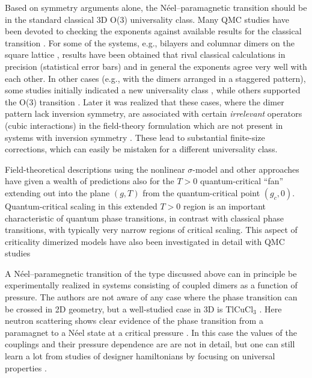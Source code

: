 \documentclass[range]{ar2e}
\begin{document}
Based on symmetry arguments alone, the N\'eel--paramagnetic transition should be in the standard classical 3D O($3$) universality class. Many QMC studies 
have been devoted to checking the exponents against available results for the classical transition \cite{Sandvik94,Troyer96,Matsumoto01,Wang06,Wenzel08,Wenzel09}.
For some of the systems, e.g., bilayers \cite{Wang06} and columnar dimers on the square lattice \cite{Matsumoto01,Wenzel09,Sandvik10b}, results have been 
obtained that rival classical calculations in precision (statistical error bars) and in general the exponents agree very well with each other. In other 
cases (e.g., with the dimers arranged in a staggered pattern), some studies initially indicated a new universality class \cite{Wenzel08}, while others
supported the O($3$) transition \cite{Jiang12}.  Later it was realized that these cases, where the dimer pattern lack inversion symmetry, are associated with certain
{\it irrelevant} operators (cubic interactions) in the field-theory formulation which are not present in systems with inversion symmetry \cite{Fritz11}. 
These lead to substantial finite-size corrections, which can easily be mistaken for a different universality class.

Field-theoretical descriptions using the nonlinear $\sigma$-model \cite{Haldane83,Chakravarty89,Chubukov94} and other approaches have given a wealth of 
predictions also for the $T>0$ quantum-critical ``fan'' extending out into the plane $(g,T)$  from the quantum-critical point $(g_c,0)$. Quantum-critical
scaling in this extended $T>0$ region is an important characteristic of quantum phase transitions, in contrast with classical phase transitions, with typically 
very narrow regions of critical scaling. This aspect of criticality dimerized models have also been investigated in detail with QMC studies \cite{Sandvik95,Brenig06,Sandvik11a}

A N\'eel--paramegnetic transition of the type discussed above can in principle be experimentally realized in systems consisting of coupled dimers as a function 
of pressure. The authors are not aware of any case where the phase transition can be crossed in 2D geometry, but a well-studied case in 3D is TlCuCl$_3$ 
\cite{Cavadini01,Ruegg04}. Here neutron scattering shows clear evidence of the phase transition from a paramagnet to a N\'eel state at a critical pressure 
\cite{Ruegg08}. In this case the values of the couplings and their pressure dependence are are not in detail, but one can still learn a lot from studies 
of designer hamiltonians by focusing on universal properties \cite{Troyer97,Jin12,Oitmaa11}.
\end{document}
